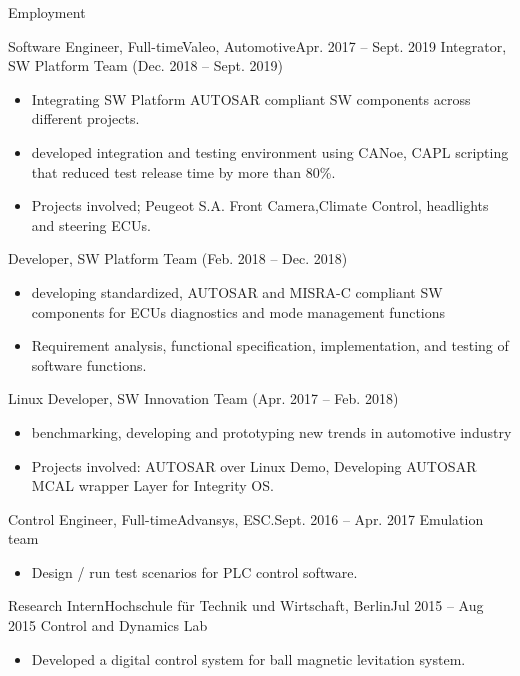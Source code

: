 \documentclass[]{mcdowellcv}
\begin{document}
\begin{cvsection}{Employment}
		\begin{cvsubsection}{Software Engineer, Full-time}{Valeo, Automotive}{Apr. 2017 -- Sept. 2019}	
			Integrator, SW Platform Team (Dec. 2018 -- Sept. 2019)
			\begin{itemize}
				\item Integrating SW Platform AUTOSAR compliant SW components across different projects.
				\item developed integration and testing environment using CANoe, CAPL scripting that reduced test release time by more than 80\%.
				\item Projects involved; Peugeot S.A. Front Camera,Climate Control, headlights and steering ECUs.
			\end{itemize}
			Developer, SW Platform Team (Feb. 2018 -- Dec. 2018)
			\begin{itemize}
				\item developing standardized, AUTOSAR and MISRA-C compliant SW components for ECUs diagnostics and mode management functions
				\item Requirement analysis, functional specification, implementation, and testing of software functions.
			\end{itemize}
			Linux Developer, SW Innovation Team (Apr. 2017 -- Feb. 2018)
			\begin{itemize}
				\item benchmarking, developing and prototyping new trends in automotive industry 
				\item Projects involved: AUTOSAR over Linux Demo, Developing AUTOSAR MCAL wrapper Layer for Integrity OS.
			\end{itemize}
			
		\end{cvsubsection}
		
		\begin{cvsubsection}{Control Engineer, Full-time}{Advansys, ESC.}{Sept. 2016 -- Apr. 2017}
			Emulation team
			\begin{itemize}
				\item Design / run test scenarios for PLC control software.
			\end{itemize}
		\end{cvsubsection}
		
		\begin{cvsubsection}{Research Intern}{Hochschule für Technik und Wirtschaft, Berlin}{Jul 2015 -- Aug 2015}
			Control and Dynamics Lab		
			\begin{itemize}
				\item Developed a digital control system for ball magnetic levitation system.
			\end{itemize}
		\end{cvsubsection}
		
	\end{cvsection}
	
\end{document}
